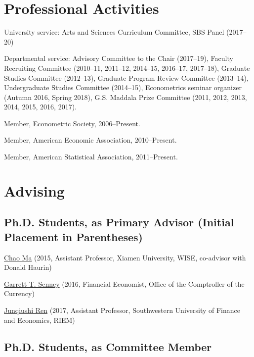 \documentclass[10pt,letterpaper]{article}
\renewenvironment{itemize}{
  \begin{list}{}{
      \setlength{\leftmargin}{1.5em}
      \setlength{\itemsep}{0.25em}
      \setlength{\parskip}{0pt}
      \setlength{\parsep}{0.25em}
    }
}{
  \end{list}
}
\begin{document}
\section*{Professional Activities}

\begin{itemize}
\item University service:
  Arts and Sciences Curriculum Committee, SBS Panel (2017--20)
\item Departmental service:
  Advisory Committee to the Chair (2017--19),
  Faculty Recruiting Committee (2010--11, 2011--12, 2014--15, 2016--17, 2017--18),
  Graduate Studies Committee (2012--13),
  Graduate Program Review Committee (2013--14),
  Undergraduate Studies Committee (2014--15),
  Econometrics seminar organizer (Autumn 2016, Spring 2018),
  G.S. Maddala Prize Committee (2011, 2012, 2013, 2014, 2015, 2016, 2017).
\item Member, Econometric Society, 2006--Present.
\item Member, American Economic Association, 2010--Present.
\item Member, American Statistical Association, 2011--Present.
\end{itemize}

\section*{Advising}

\subsection*{Ph.D. Students, as Primary Advisor (Initial Placement in Parentheses)}

\begin{itemize}
\item \href{http://chaoma2014.weebly.com}{Chao Ma} (2015, Assistant Professor, Xiamen University, WISE, co-advisor with Donald Haurin)
\item \href{http://garrettsenney.weebly.com}{Garrett T. Senney} (2016, Financial Economist, Office of the Comptroller of the Currency)
\item \href{http://junqiushi-ren.weebly.com}{Junqiushi Ren} (2017, Assistant Professor, Southwestern University of Finance and Economics, RIEM) %
\end{itemize}

\subsection*{Ph.D. Students, as Committee Member}
\end{document}
